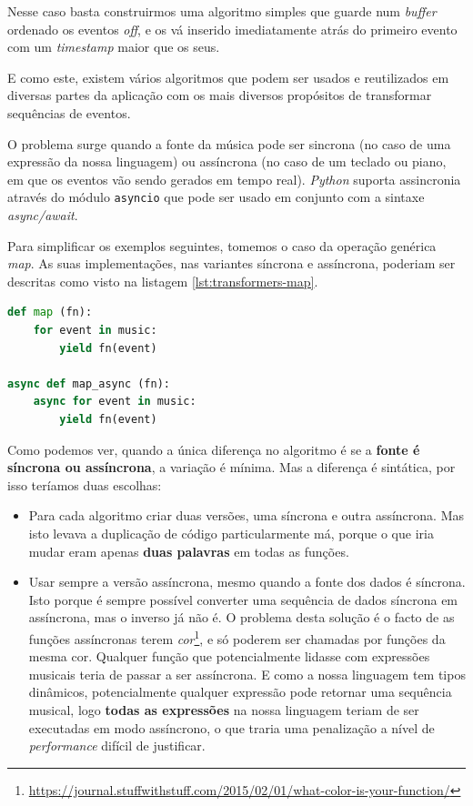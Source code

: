 Nesse caso basta construirmos uma algoritmo simples que guarde num \textit{buffer} ordenado os eventos \textit{off}, e os vá inserido imediatamente atrás do primeiro evento com um \textit{timestamp} maior que os seus.

E como este, existem vários algoritmos que podem ser usados e reutilizados em diversas partes da aplicação com os mais diversos propósitos de transformar sequências de eventos.

O problema surge quando a fonte da música pode ser sincrona (no caso de uma expressão da nossa linguagem) ou assíncrona (no caso de um teclado ou piano, em que os eventos vão sendo gerados em tempo real). \textit{Python} suporta assincronia através do módulo \texttt{asyncio} que pode ser usado em conjunto com a sintaxe \textit{async/await}.

Para simplificar os exemplos seguintes, tomemos o caso da operação genérica \textit{map}. As suas implementações, nas variantes síncrona e assíncrona, poderiam ser descritas como visto na listagem \ref{lst:transformers-map}.

\begin{lstlisting}[caption={Exemplo de uma função \texttt{map} com versões sincronas e asíncronas},label={lst:transformers-map},language=Python]
def map (fn):
    for event in music:
        yield fn(event)

async def map_async (fn):
    async for event in music:
        yield fn(event)
\end{lstlisting}

Como podemos ver, quando a única diferença no algoritmo é se a \textbf{fonte é síncrona ou assíncrona}, a variação é mínima. Mas a diferença é sintática, por isso teríamos duas escolhas:
\begin{itemize}
 \item Para cada algoritmo criar duas versões, uma síncrona e outra assíncrona. Mas isto levava a duplicação de código particularmente má, porque o que iria mudar eram apenas \textbf{duas palavras} em todas as funções.
 
 \item Usar sempre a versão assíncrona, mesmo quando a fonte dos dados é síncrona. Isto porque é sempre possível converter uma sequência de dados síncrona em assíncrona, mas o inverso já não é. O problema desta solução é o facto de as funções assíncronas terem \textit{cor}\footnote{\url{https://journal.stuffwithstuff.com/2015/02/01/what-color-is-your-function/}}, e só poderem ser chamadas por funções da mesma cor. Qualquer função que potencialmente lidasse com expressões musicais teria de passar a ser assíncrona. E como a nossa linguagem tem tipos dinâmicos, potencialmente qualquer expressão pode retornar uma sequência musical, logo \textbf{todas as expressões} na nossa linguagem teriam de ser executadas em modo assíncrono, o que traria uma penalização a nível de \textit{performance} difícil de justificar.
\end{itemize}


